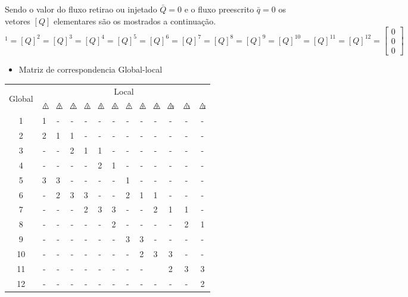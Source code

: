 \documentclass{article} %
\newcommand{\trinum}[1]{%
	\triangle\hspace{-.57em}\raisebox{0.1em}{\scalebox{.5}{#1}}
}
\begin{document}
Sendo o valor do fluxo retirao ou injetado \(\bar{Q}=0\) e o fluxo preescrito \(\bar{q}=0\) os vetores \([Q]\) elementares são os mostrados a continuação.
\begin{equation*}
[{Q}]^{1}=[{Q}]^{2}=[{Q}]^{3}=[{Q}]^{4}=[{Q}]^{5}=[{Q}]^{6}=[{Q}]^{7}=[{Q}]^{8}=[{Q}]^{9}=[{Q}]^{10}=[{Q}]^{11}=[{Q}]^{12}=\begin{bmatrix}
0\\0\\0
\end{bmatrix}
\end{equation*}
\begin{itemize}
	\item Matriz de correspondencia Global-local
\end{itemize}



\begin{table}[H]
	\centering
	\begin{tabular}{@{}ccccccccccccc@{}}
		\toprule
		\multirow{2}{*}{Global} & \multicolumn{12}{c}{Local} \\ \cmidrule(l){2-13} 
		& $\trinum{1}$& $\trinum{2}$ & $\trinum{3}$ & $\trinum{4}$ &$\trinum{5}$ &$\trinum{6}$ &$\trinum{7}$ &$\trinum{8}$ &$\trinum{9}$ &$\trinum{10}$ &$\trinum{11}$ &$\trinum{12}$ \\ \midrule
		1 & 1 & - & - & - & - & - & - & -& - & - & - & -\\
		2 & 2 & 1 & 1& -& - & - & - & -& - & - & - & - \\
		3 & - & - & 2 & 1& 1 & - & - & -& - & - & - & - \\
		4 & - & -& - & - & 2 & 1& - & -& - & - & - & -\\
		5 & 3 & 3 & - & -& - & - & 1 & -& - & - & - & - \\
		6 & - & 2 & 3 & 3& - & - & 2 & 1& 1 & - & - & -\\
		7 & - & - & - & 2 & 3 & 3 & - & -& 2 & 1 & 1 & -\\
		8 & - & - & - & -& - & 2 & - & -& -& - & 2 & 1 \\
		9 & - & - & - & - & - & - & 3 & 3&- & - & - & -\\
		10 & - & - & - & - & -& - & - & 2& 3 & 3 & - & -\\
		11 & - & - & - & - & -& - & - & -&  & 2 & 3 & 3\\
		12 & - & - & - & - & - & - & - & -& - & - & - & 2\\ \bottomrule
	\end{tabular}
\end{table}
\end{document}
